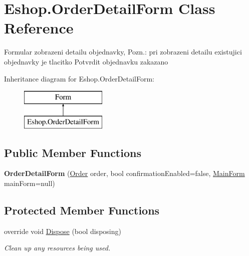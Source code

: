 \hypertarget{class_eshop_1_1_order_detail_form}{}\section{Eshop.\+Order\+Detail\+Form Class Reference}
\label{class_eshop_1_1_order_detail_form}


Formular zobrazeni detailu objednavky, Pozn.\+: pri zobrazeni detailu existujici objednavky je tlacitko Potvrdit objednavku zakazano  


Inheritance diagram for Eshop.\+Order\+Detail\+Form\+:\begin{figure}[H]
\begin{center}
\leavevmode
\includegraphics[height=2.000000cm]{class_eshop_1_1_order_detail_form}
\end{center}
\end{figure}
\subsection*{Public Member Functions}
\begin{DoxyCompactItemize}
\item 
\mbox{\label{class_eshop_1_1_order_detail_form_ac9633df6070317ae4d969e3aadeae72c}} 
{\bfseries Order\+Detail\+Form} (\mbox{\hyperlink{class_eshop_1_1_order}{Order}} order, bool confirmation\+Enabled=false, \mbox{\hyperlink{class_eshop_1_1_main_form}{Main\+Form}} main\+Form=null)
\end{DoxyCompactItemize}
\subsection*{Protected Member Functions}
\begin{DoxyCompactItemize}
\item 
override void \mbox{\hyperlink{class_eshop_1_1_order_detail_form_a8c1adb79d7320d2f2fe3919c05acbd2a}{Dispose}} (bool disposing)
\begin{DoxyCompactList}\small\item\em Clean up any resources being used. \end{DoxyCompactList}\end{DoxyCompactItemize}
